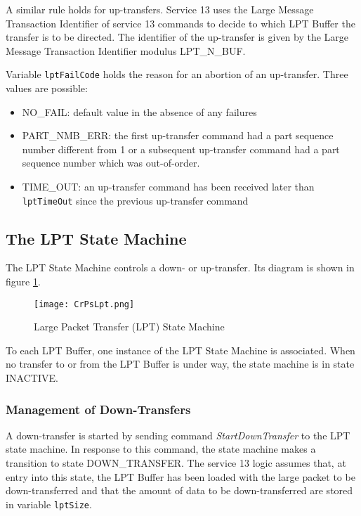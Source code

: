 \documentclass{pnp_article}
\begin{document}
A similar rule holds for up-transfers. Service 13 uses the Large Message Transaction Identifier of service 13 commands to decide to which LPT Buffer the transfer is to be directed. The identifier of the up-transfer is given by the Large Message Transaction Identifier modulus LPT\_N\_BUF.

Variable \texttt{lptFailCode} holds the reason for an abortion of an up-transfer. Three values are possible:

\begin{itemize}
\item NO\_FAIL: default value in the absence of any failures
\item PART\_NMB\_ERR: the first up-transfer command had a part sequence number different from 1 or a subsequent up-transfer command had a part sequence number which was out-of-order.
\item TIME\_OUT: an up-transfer command has been received later than \texttt{lptTimeOut} since the previous up-transfer command
\end{itemize}


\subsection{The LPT State Machine}
The LPT State Machine controls a down- or up-transfer. Its diagram is shown in figure \ref{fig:LPT}.

\begin{figure}[H]
 \centering
 \texttt{[image: CrPsLpt.png]}
 \caption{Large Packet Transfer (LPT) State Machine}
 \label{fig:LPT}
\end{figure}

To each LPT Buffer, one instance of the LPT State Machine is associated. When no transfer to or from the LPT Buffer is under way, the state machine is in state INACTIVE. 

\subsubsection{Management of Down-Transfers}
A down-transfer is started by sending command \textit{StartDownTransfer} to the LPT state machine. In response to this command, the state machine makes a transition to state DOWN\_TRANSFER. The service 13 logic assumes that, at entry into this state, the LPT Buffer has been loaded with the large packet to be down-transferred and that the amount of data to be down-transferred are stored in variable \texttt{lptSize}.
\end{document}
